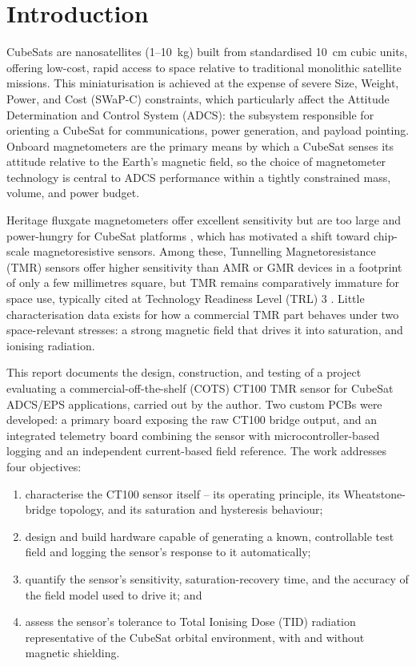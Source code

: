 \documentclass[12pt,a4paper]{article}
\begin{document}
\section{Introduction}
\label{sec:intro}

CubeSats are nanosatellites (1--10~kg) built from standardised 10~cm cubic units, offering low-cost, rapid access to space relative to traditional monolithic satellite missions. This miniaturisation is achieved at the expense of severe Size, Weight, Power, and Cost (SWaP-C) constraints, which particularly affect the Attitude Determination and Control System (ADCS): the subsystem responsible for orienting a CubeSat for communications, power generation, and payload pointing. Onboard magnetometers are the primary means by which a CubeSat senses its attitude relative to the Earth's magnetic field, so the choice of magnetometer technology is central to ADCS performance within a tightly constrained mass, volume, and power budget.

Heritage fluxgate magnetometers offer excellent sensitivity but are too large and power-hungry for CubeSat platforms \cite{survey-magnetic-sensing}, which has motivated a shift toward chip-scale magnetoresistive sensors. Among these, Tunnelling Magnetoresistance (TMR) sensors offer higher sensitivity than AMR or GMR devices in a footprint of only a few millimetres square, but TMR remains comparatively immature for space use, typically cited at Technology Readiness Level (TRL) 3 \cite{alves-thesis}. Little characterisation data exists for how a commercial TMR part behaves under two space-relevant stresses: a strong magnetic field that drives it into saturation, and ionising radiation.

This report documents the design, construction, and testing of a project evaluating a commercial-off-the-shelf (COTS) CT100 TMR sensor for CubeSat ADCS/EPS applications, carried out by the author. Two custom PCBs were developed: a primary board exposing the raw CT100 bridge output, and an integrated telemetry board combining the sensor with microcontroller-based logging and an independent current-based field reference. The work addresses four objectives:

\begin{enumerate}[label=(\roman*)]
\item characterise the CT100 sensor itself -- its operating principle, its Wheatstone-bridge topology, and its saturation and hysteresis behaviour;
\item design and build hardware capable of generating a known, controllable test field and logging the sensor's response to it automatically;
\item quantify the sensor's sensitivity, saturation-recovery time, and the accuracy of the field model used to drive it; and
\item assess the sensor's tolerance to Total Ionising Dose (TID) radiation representative of the CubeSat orbital environment, with and without magnetic shielding.
\end{enumerate}
\end{document}
